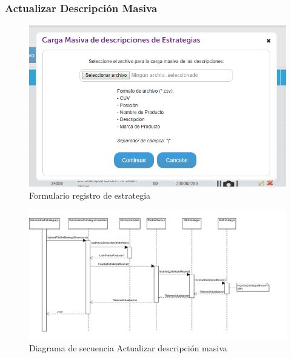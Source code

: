 \documentclass[a4paper,11pt]{paper}
\begin{document}
\newpage
\subsubsection{Actualizar Descripción Masiva}
\begin{figure}[h]
\centering
\includegraphics[width=1.0\textwidth]{imgs/Estrategia/FormularioActualizarDescripcionMasivaEstrategia.png}
\caption{Formulario registro de estrategia}
\end{figure}

\newpage
\begin{landscape}
\begin{figure}[!h]
\centering
\includegraphics[width=1.5\textwidth]{imgs/Estrategia/ActualizarDescripcionMasivaEstrategia.png}
\caption{Diagrama de secuencia Actualizar descripción masiva}
\end{figure}
\end{landscape} 


\newpage
\end{document}
